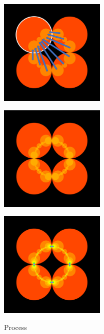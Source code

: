 \begin{figure}[htbp]
\begin{minipage}{0.33\hsize}
\begin{center}
  \end{center}
 \end{minipage}
 \begin{minipage}{0.33\hsize}
  \begin{center}
   \includegraphics[width=2in, height=2in, keepaspectratio]{../img/klein/orbit/level1inv.pdf}
   \label{fig:level1inv}
  \end{center}
 \end{minipage}
 \begin{minipage}{0.33\hsize}
  \begin{center}
   \includegraphics[width=2in, height=2in, keepaspectratio]{../img/klein/orbit/level2.pdf}
   \label{fig:level2}
  \end{center}
 \end{minipage}
 \begin{minipage}{0.33\hsize}
  \begin{center}
   \includegraphics[width=2in, height=2in, keepaspectratio]{../img/klein/orbit/levelMax.pdf}
   \label{fig:levelMax}
  \end{center}
 \end{minipage}
 \caption{Process}
\end{figure}

